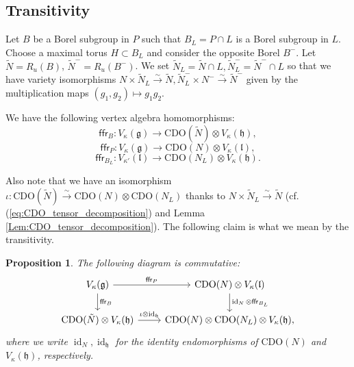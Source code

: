\documentclass{amsart}
\newtheorem{Prop}[Thm]{Proposition}
\theoremstyle{definition}
\newcommand{\g}{\mathfrak{g}}
\newcommand{\h}{\mathfrak{h}}
\newcommand{\lf}{\mathfrak{l}}
\newcommand{\CDO}{\mathrm{CDO}}
\numberwithin{equation}{section}
\begin{document}
%


\subsection{Transitivity} \label{ss:diglets}
Let $B$ be a Borel subgroup in $P$ such that $B_L = P \cap L$ is a Borel subgroup in $L$. Choose a maximal torus $H \subset B_L$ and consider the opposite Borel $B^-$. Let $\tilde{N} = R_u(B)$, $\tilde{N}^- = R_u(B^-)$. We set $\tilde{N}_L = \tilde{N}\cap L, \tilde{N}^-_L = \tilde{N}^-\cap L$ so that we have variety isomorphisms $N\times \tilde{N}_L\xrightarrow{\sim} \tilde{N}, 
\tilde{N}^-_L\times N^-\xrightarrow{\sim} \tilde{N}^-$ given by the multiplication maps $(g_1,g_2)\mapsto g_1g_2$.

We have the following vertex algebra homomorphisms:
\[
\mathsf{ffr}_{B}: V_{\kappa}(\g) \to \CDO(\tilde{N}) \otimes V_{\kappa}(\h),
\]
\[
\mathsf{ffr}_{P}: V_{\kappa}(\g) \to \CDO(N) \otimes V_{\kappa}(\lf),
\]
\[
\mathsf{ffr}_{B_L}: V_{\kappa'}(\lf) \to \CDO(N_L) \otimes V_{\kappa}(\h).
\]

Also note that we have an isomorphism $\iota:\CDO(\tilde{N})\xrightarrow{\sim}\CDO(N) \otimes \CDO(N_L)$ thanks to $N\times \tilde{N}_L\xrightarrow{\sim} \tilde{N}$ (cf. (\ref{eq:CDO_tensor_decomposition}) and Lemma 
\ref{Lem:CDO_tensor_decomposition}). The following claim is what we mean by the transitivity.

\begin{Prop}\label{Prop:ffr_transitivity}
The following diagram is commutative:
\[
\begin{tikzcd}
V_\kappa(\g) \arrow{r}{\mathsf{ffr}_P} \arrow{d}{\mathsf{ffr}_B}
& \CDO(N) \otimes V_{\kappa}(\lf) \arrow{d}{\operatorname{id}_N\otimes \mathsf{ffr}_{B_L}} \\
\CDO(\tilde{N}) \otimes V_{\kappa}(\h) \arrow{r}{\iota\otimes \operatorname{id}_\h} & \CDO(N) \otimes \CDO(N_L)\otimes V_{\kappa}(\h),  
\end{tikzcd}
\]
where we write $\operatorname{id}_N, \operatorname{id}_{\h}$ for the identity endomorphisms of $\CDO(N)$ and $V_\kappa(\h)$, respectively.
\end{Prop}
\end{document}
